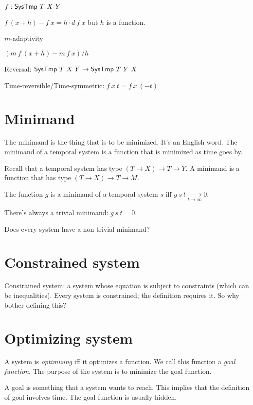 \( f : \textsf{SysTmp}~T~X~Y \)

\( f~(x+h) - f~x = h \cdot d~f~x \) but \(h\) is a function.

\(m\)-adaptivity

\( (m~f~(x+h) - m~f~x) / h \)

Reversal:
\( \textsf{SysTmp}~T~X~Y \to \textsf{SysTmp}~T~Y~X \)

Time-reversible/Time-symmetric:
\( f~x~t = f~x~(-t) \)

\section{Minimand}

The minimand is the thing that is to be minimized.
It's an English word.
The minimand of a temporal system is a function that is minimized as time goes by.

Recall that a temporal system has type \((T \to X) \to T \to Y\).
A minimand is a function that has type \((T \to X) \to T \to M\).

\begin{m:def}
    The function \(g\) is a minimand of a temporal system \(s\) iff \(g~s~t \xrightarrow[t \to \infty]{} 0\).
\end{m:def}

There's always a trivial minimand: \(g~s~t = 0\).

Does every system have a non-trivial minimand?

\section{Constrained system}

Constrained system: a system whose equation is subject to constraints (which can be inequalities).
Every system is constrained; the definition requires it. So why bother defining this?

\section{Optimizing system}

A system is \emph{optimizing} iff it optimizes a function.
We call this function a \emph{goal function}.
The purpose of the system is to minimize the goal function.

A goal is something that a system wants to reach.
This implies that the definition of goal involves time.
The goal function is usually hidden.

